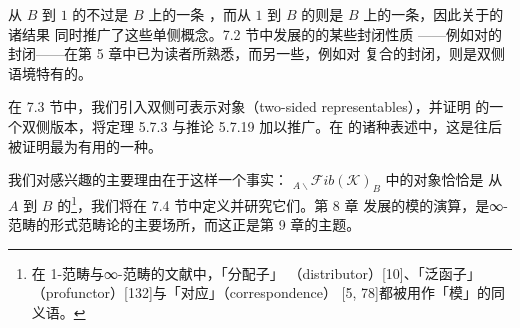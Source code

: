 从 $B$ 到 $1$ 的\trTwoSidedFibration{}不过是 $B$ 上的一条%
\trCocartesianFibration，而从 $1$ 到 $B$ 的\trTwoSidedFibration{}则是
$B$ 上的一条\trCartesianFibration，因此关于\trTwoSidedFibration{}的诸结果
同时推广了这些单侧概念。7.2 节中发展的\trTwoSidedFibration{}的某些封闭性质
——例如对\trPullback{}的封闭——在第 5 章中已为读者所熟悉，而另一些，例如对%
\trSpan{}复合的封闭，则是双侧语境特有的。

在 7.3 节中，我们引入双侧可表示对象（two-sided representables），并证明%
\trYonedaLemma{}的一个双侧版本，将定理 5.7.3 与推论 5.7.19 加以推广。在%
\trYonedaLemma{}的诸种表述中，这是往后被证明最为有用的一种。

我们对\trTwoSidedFibration{}感兴趣的主要理由在于这样一个事实：%
${}_{A\backslash}\mathcal{F}\mathit{ib}(\mathcal{K})_{B}$ 中的\trDiscrete{}对象恰恰是
从 $A$ 到 $B$ 的\emph{\trModule}\footnote{在 1-范畴与∞-范畴的文献中，「分配子」
（distributor）[10]、「泛函子」（profunctor）[132]与「对应」（correspondence）
[5, 78]都被用作「模」的同义语。}，我们将在 7.4 节中定义并研究它们。第 8 章
发展的模的演算，是∞-范畴的形式范畴论的主要场所，而这正是第 9 章的主题。

